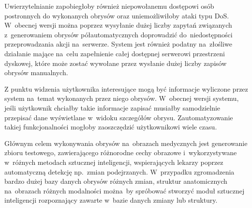 \documentclass[a4paper,11pt,twoside,openright]{report}
\newcommand\blankpage{%
    \null
    \thispagestyle{empty}%
    \newpage}
\theoremstyle{definition}
\begin{document}
Uwierzytelnianie zapobiegłoby również niepowołanemu dostępowi osób postronnych
do wykonanych obrysów oraz uniemożliwiłoby ataki typu DoS. W~obecnej wersji można
poprzez wysyłanie dużej liczby zapytań związanych z~generowaniem obrysów półautomatycznych
doprowadzić do~niedostępności przeprowadzania akcji na~serwerze. System jest również
podatny na~złośliwe działanie mające na~celu zapełnienie całej dostępnej serwerowi
przestrzeni dyskowej, które może zostać wywołane przez wysłanie dużej liczby
zapisów obrysów manualnych.

Z punktu widzenia użytkownika interesujące mogą być informacje wyliczone przez
system na~temat wykonanych przez niego obrysów. W~obecnej wersji systemu, jeśli
użytkownik chciałby takie informacje zapisać musiałby samodzielnie przepisać dane
wyświetlane w~widoku szczegółów obrysu. Zautomatyzowanie takiej funkcjonalności
mogłoby zaoszczędzić użytkownikowi wiele czasu.

Głównym celem wykonywania obrysów na~obrazach medycznych jest generowanie zbioru
testowego, zawierającego różnorodne cechy obrazowe i~wykorzystywane w~różnych
metodach sztucznej inteligencji, wspierających lekarzy poprzez automatyczną
detekcję np.~zmian podejrzanych. W~przypadku zgromadzenia bardzo dużej bazy danych
obrysów różnych zmian, struktur anatomicznych na~obrazach różnych modalności można~by
spróbować stworzyć moduł sztucznej inteligencji rozpoznający zawarte w~bazie danych zmiany lub struktury.




\end{document}
